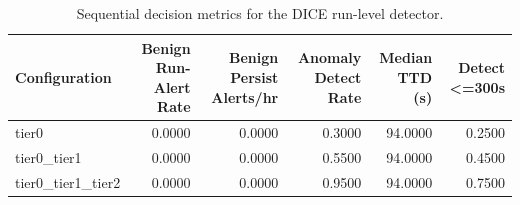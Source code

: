 \begin{table}[t]
\centering
\caption{Sequential decision metrics for the DICE run-level detector.}
\label{tab:dice_sequential_metrics}
\footnotesize
\begin{tabular}{lrrrrr}
\toprule
Configuration & Benign Run-Alert Rate & Benign Persist Alerts/hr & Anomaly Detect Rate & Median TTD (s) & Detect <=300s \\
\midrule
tier0 & 0.0000 & 0.0000 & 0.3000 & 94.0000 & 0.2500 \\
tier0_tier1 & 0.0000 & 0.0000 & 0.5500 & 94.0000 & 0.4500 \\
tier0_tier1_tier2 & 0.0000 & 0.0000 & 0.9500 & 94.0000 & 0.7500 \\
\bottomrule
\end{tabular}

\end{table}
